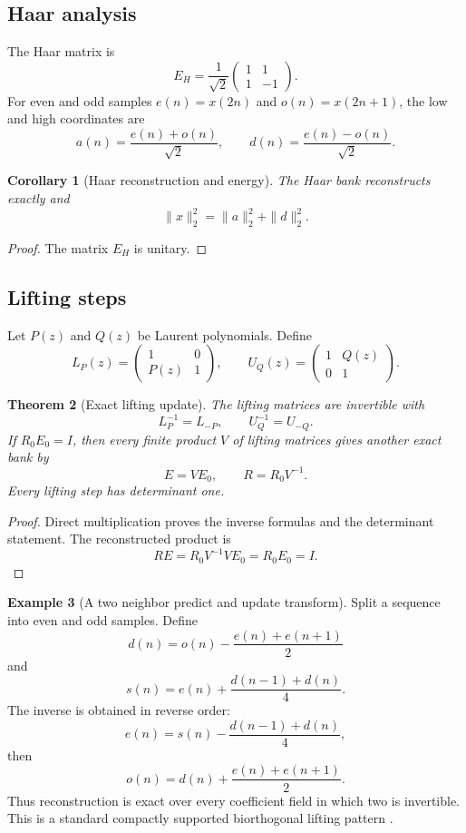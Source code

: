 \documentclass[11pt,a4paper]{article}
\newtheorem{theorem}{Theorem}[section]
\newtheorem{corollary}[theorem]{Corollary}
\theoremstyle{definition}
\newtheorem{example}[theorem]{Example}
\theoremstyle{remark}
\begin{document}
\subsection{Haar analysis}

The Haar matrix is
\[
E_H
=
\frac1{\sqrt2}
\begin{pmatrix}
1&1\\
1&-1
\end{pmatrix}.
\]
For even and odd samples \(e(n)=x(2n)\) and \(o(n)=x(2n+1)\), the low and high coordinates are
\[
a(n)=\frac{e(n)+o(n)}{\sqrt2},
\qquad
d(n)=\frac{e(n)-o(n)}{\sqrt2}.
\]

\begin{corollary}[Haar reconstruction and energy]\label{cor:haar_reconstruction}
The Haar bank reconstructs exactly and
\[
\|x\|_2^2=\|a\|_2^2+\|d\|_2^2.
\]
\end{corollary}

\begin{proof}
The matrix \(E_H\) is unitary.
\end{proof}

\subsection{Lifting steps}

Let \(P(z)\) and \(Q(z)\) be Laurent polynomials. Define
\[
L_P(z)
=
\begin{pmatrix}
1&0\\
P(z)&1
\end{pmatrix},
\qquad
U_Q(z)
=
\begin{pmatrix}
1&Q(z)\\
0&1
\end{pmatrix}.
\]

\begin{theorem}[Exact lifting update]\label{thm:lifting_update}
The lifting matrices are invertible with
\[
L_P^{-1}=L_{-P},
\qquad
U_Q^{-1}=U_{-Q}.
\]
If \(R_0E_0=I\), then every finite product \(V\) of lifting matrices gives another exact bank by
\[
E=VE_0,
\qquad
R=R_0V^{-1}.
\]
Every lifting step has determinant one.
\end{theorem}

\begin{proof}
Direct multiplication proves the inverse formulas and the determinant statement. The reconstructed product is
\[
RE
=R_0V^{-1}VE_0
=R_0E_0
=I.
\]
\end{proof}

\begin{example}[A two neighbor predict and update transform]\label{ex:predict_update}
Split a sequence into even and odd samples. Define
\[
d(n)
=o(n)-\frac{e(n)+e(n+1)}2
\]
and
\[
s(n)
=e(n)+\frac{d(n-1)+d(n)}4.
\]
The inverse is obtained in reverse order:
\[
e(n)
=s(n)-\frac{d(n-1)+d(n)}4,
\]
then
\[
o(n)
=d(n)+\frac{e(n)+e(n+1)}2.
\]
Thus reconstruction is exact over every coefficient field in which two is invertible. This is a standard compactly supported biorthogonal lifting pattern \cite{CohenDaubechiesFeauveau1992,Sweldens1996,DaubechiesSweldens1998}.
\end{example}
\end{document}
